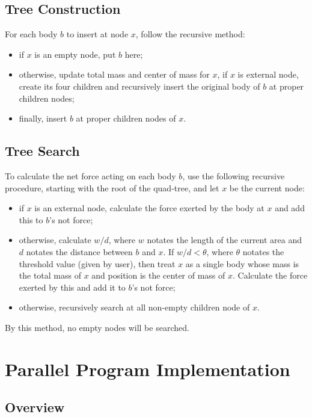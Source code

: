 \documentclass[11pt, a4paper]{article}
\begin{document}
\subsection{Tree Construction}

For each body $b$ to insert at node $x$, follow the recursive method:

\begin{itemize}
    \item if $x$ is an empty node, put $b$ here;
    \item otherwise, update total mass and center of mass for $x$, if $x$ is external node, create its four children and recursively insert the original body of $b$ at proper children nodes;
    \item finally, insert $b$ at proper children nodes of $x$.
\end{itemize}

\subsection{Tree Search}

To calculate the net force acting on each body $b$, use the following recursive procedure, starting with the root of the quad-tree, and let $x$ be the current node:

\begin{itemize}
    \item if $x$ is an external node, calculate the force exerted by the body at $x$ and add this to $b$'s not force;
    \item otherwise, calculate $w / d$, where $w$ notates the length of the current area and $d$ notates the distance between $b$ and $x$. If $w / d < \theta$, where $\theta$ notates the threshold value (given by user), then treat $x$ as a single body whose mass is the total mass of $x$ and position is the center of mass of $x$. Calculate the force exerted by this and add it to $b$'s not force;
    \item otherwise, recursively search at all non-empty children node of $x$.
\end{itemize}

By this method, no empty nodes will be searched.

\section{Parallel Program Implementation}

\subsection{Overview}
\end{document}
